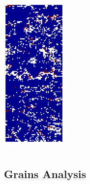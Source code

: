 \begin{frame}[fragile]
\begin{columns}
\begin{column}{3.5cm}
{      \includegraphics[height=7.5cm]{pic/ebsdphase}%
      }%
    \end{column}
  \end{columns}
\end{frame}

\subsection*{Grains Analysis}

